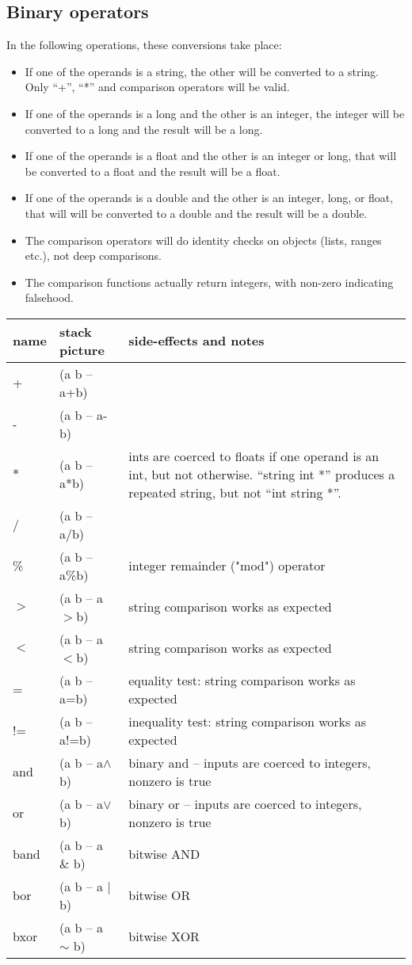 \subsection{Binary operators}
In the following operations, these conversions take place:
\begin{itemize}
\item If one of the operands is a string, the other will be converted to a string. Only ``+'', ``*''  and comparison operators will be valid.
\item If one of the operands is a long and the other is an integer, the integer will be converted to a long and the result will be a long.
\item If one of the operands is a float and the other is an integer or long, that will be converted to a float and the result will be a float.
\item If one of the operands is a double and the other is an integer, long, or float, that will will be converted to a double and the result will be a double.
\item The comparison operators will do identity checks on objects (lists, ranges etc.), not deep comparisons.
\item The comparison functions actually return integers, with non-zero indicating falsehood.
\end{itemize}
\begin{center}
\begin{tabular}{|l|l|p{4in}|}\hline
\textbf{name} & \textbf{stack picture} & \textbf{side-effects and notes}\\ \hline
+    & (a b -- a+b)&\\
-    & (a b -- a-b)&\\
$*$    & (a b -- a*b)& ints are coerced to floats if one operand is an int, but not otherwise. ``string int *'' produces
a repeated string, but not ``int string *''.\\
/    & (a b -- a/b)&\\
\%    & (a b -- a\%b) & integer remainder ("mod") operator\\
$>$    & (a b -- a$>$b)& string comparison works as expected\\
$<$    & (a b -- a$<$b)& string comparison works as expected\\
=    & (a b -- a=b)& equality test: string comparison works as expected\\
!=   & (a b -- a!=b)& inequality test: string comparison works as expected\\
and & (a b -- a$\wedge$b) & binary and -- inputs are coerced to integers, nonzero is true\\
or & (a b -- a$\vee$b) & binary or  -- inputs are coerced to integers, nonzero is true\\
band & (a b -- a \& b) & bitwise AND \\
bor & (a b -- a $|$ b) & bitwise OR \\
bxor & (a b -- a $\sim$ b) & bitwise XOR \\
\hline
\end{tabular}
\end{center}

